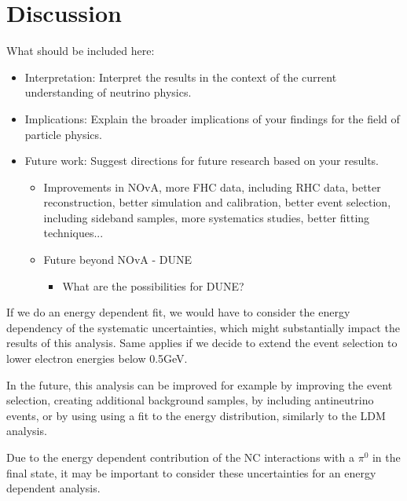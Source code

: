 \section{Discussion}\label{sec:NuMMDiscussion}

What should be included here:
\begin{itemize}
\item Interpretation: Interpret the results in the context of the current understanding of neutrino physics.
\item Implications: Explain the broader implications of your findings for the field of particle physics.
\item Future work: Suggest directions for future research based on your results.
\begin{itemize}
\item Improvements in NOvA, more FHC data, including RHC data, better reconstruction, better simulation and calibration, better event selection, including sideband samples, more systematics studies, better fitting techniques...
\item Future beyond NOvA - DUNE
\begin{itemize}
\item What are the possibilities for DUNE?
\end{itemize}
\end{itemize}
\end{itemize}

If we do an energy dependent fit, we would have to consider the energy dependency of the systematic uncertainties, which might substantially impact the results of this analysis. Same applies if we decide to extend the event selection to lower electron energies below 0.5GeV. 



In the future, this analysis can be improved for example by improving the event selection, creating additional background samples, by including antineutrino events, or by using using a fit to the energy distribution, similarly to the LDM analysis.



 Due to the energy dependent contribution of the \gls{NC} interactions with a $\pi^0$ in the final state, it may be important to consider these uncertainties for an energy dependent analysis.


